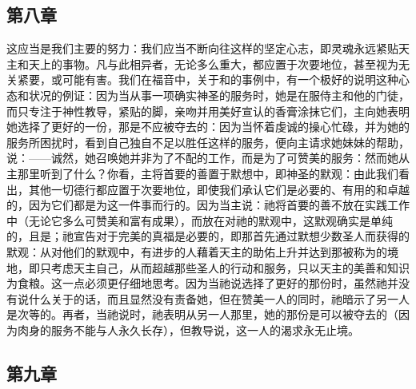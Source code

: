 
\subsection{第八章}

\par

这应当是我们主要的努力：我们应当不断向往这样的坚定心志，即灵魂永远紧贴天主和天上的事物。凡与此相异者，无论多么重大，都应置于次要地位，甚至视为无关紧要，或可能有害。我们在福音中，关于和的事例中，有一个极好的说明这种心态和状况的例证：因为当从事一项确实神圣的服务时，她是在服侍主和他的门徒，而只专注于神性教导，紧贴的脚，亲吻并用美好宣认的香膏涂抹它们，主向她表明她选择了更好的一份，那是不应被夺去的：因为当怀着虔诚的操心忙碌，并为她的服务所困扰时，看到自己独自不足以胜任这样的服务，便向主请求她妹妹的帮助，说：——诚然，她召唤她并非为了不配的工作，而是为了可赞美的服务：然而她从主那里听到了什么？你看，主将首要的善置于默想中，即神圣的默观：由此我们看出，其他一切德行都应置于次要地位，即使我们承认它们是必要的、有用的和卓越的，因为它们都是为这一件事而行的。因为当主说：祂将首要的善不放在实践工作中（无论它多么可赞美和富有成果），而放在对祂的默观中，这默观确实是单纯的，且是；祂宣告对于完美的真福是必要的，即那首先通过默想少数圣人而获得的默观：从对他们的默观中，有进步的人藉着天主的助佑上升并达到那被称为的境地，即只考虑天主自己，从而超越那些圣人的行动和服务，只以天主的美善和知识为食粮。这一点必须更仔细地思考。因为当祂说选择了更好的那份时，虽然祂并没有说什么关于的话，而且显然没有责备她，但在赞美一人的同时，祂暗示了另一人是次等的。再者，当祂说时，祂表明从另一人那里，她的那份是可以被夺去的（因为肉身的服务不能与人永久长存），但教导说，这一人的渴求永无止境。\par


\subsection{第九章}

